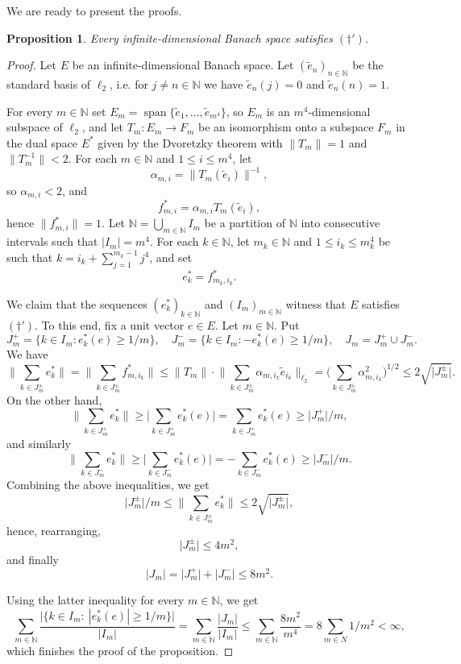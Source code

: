 \documentclass[a4paper,11pt,fleqn]{amsart}
\newtheorem{proposition}[theorem]{Proposition}
\theoremstyle{definition}
\theoremstyle{remark}
\numberwithin{equation}{section}
\newcommand{\N}{\mathbb{N}}
\DeclareMathOperator{\spn}{span}
\begin{document}
\medskip

We are ready to present the proofs.

\begin{proposition}\label{prop:daggerprim}
    Every infinite-dimensional Banach space satisfies $(\dagger')$.
\end{proposition}
\begin{proof}
    Let $E$ be an infinite-dimensional Banach space. Let $(\tilde{e}_n)_{n\in\N}$ be the standard basis of $\ell_2$, i.e. for $j\neq n\in\N$ we have $\tilde{e}_n(j)=0$ and $\tilde{e}_n(n)=1$.
    
    For every $m\in\N$ set $E_m=\spn\big\{\tilde{e}_1,\ldots,\tilde{e}_{m^4}\big\}$, so $E_m$ is an $m^4$-dimensional subspace of $\ell_2$, and let $T_m\colon E_m\to F_m$ be an isomorphism onto a subspace $F_m$ in the dual space $E^*$ given by the Dvoretzky theorem with $\|T_m\|=1$ and $\big\|T_m^{-1}\big\|<2$. For each $m\in\N$ and $1\le i\le m^4$, let 
    \[\alpha_{m,i}=\big\|T_m(\tilde{e}_i)\big\|^{-1},\]
    so $\alpha_{m,i}<2$, and
    \[f_{m,i}^*=\alpha_{m,i}T_m(\tilde{e}_i),\]
    hence $\big\|f_{m,i}^*\big\|=1$. Let $\N=\bigcup_{m\in\N}I_m$ be a partition of $\N$ into consecutive intervals such that $|I_m|=m^4$. For each $k\in\N$, let $m_k\in\N$ and $1\le i_k\le m_k^4$ be such that $k=i_k+\sum_{j=1}^{m_k-1}j^4$, and set 
    \[e_k^*=f_{m_k,i_k}^*.\]

    We claim that the sequences $(e_k^*)_{k\in\N}$ and $(I_m)_{m\in\N}$ witness that $E$ satisfies $(\dagger')$. To this end, fix a unit vector $e\in E$. Let $m\in\N$. Put
    \[J_m^+=\big\{k\in I_m\colon e_k^*(e)\ge1/m\big\},\quad J_m^-=\big\{k\in I_m\colon -e_k^*(e)\ge1/m\big\},\quad J_m=J_m^+\cup J_m^-.\]
    We have
    \[\bigg\|\sum_{k\in J_m^{\pm}}e_k^*\bigg\|=\bigg\|\sum_{k\in J_m^{\pm}}f_{m,i_k}^*\bigg\|\le\|T_m\|\cdot\bigg\|\sum_{k\in J_m^{\pm}}\alpha_{m,i_k}\tilde{e}_{i_k}\bigg\|_{\ell_2}=\bigg(\sum_{k\in J_m^{\pm}}\alpha_{m,i_k}^2\bigg)^{1/2}\le2\sqrt{\big|J_m^{\pm}\big|}.\]
    On the other hand,
    \[\bigg\|\sum_{k\in J_m^+}e_k^*\bigg\|\ge\bigg|\sum_{k\in J_m^+}e_k^*(e)\bigg|=\sum_{k\in J_m^+}e_k^*(e)\ge\big|J_m^+\big|/m,\]
    and similarly
    \[\bigg\|\sum_{k\in J_m^-}e_k^*\bigg\|\ge\bigg|\sum_{k\in J_m^-}e_k^*(e)\bigg|=-\sum_{k\in J_m^-}e_k^*(e)\ge\big|J_m^-\big|/m.\]
    Combining the above inequalities, we get
     \[\big|J_m^{\pm}\big|/m\le\bigg\|\sum_{k\in J_m^{\pm}}e_k^*\bigg\|\le2\sqrt{\big|J_m^{\pm}\big|},\]%
     hence, rearranging,
     \[\big|J_m^{\pm}\big|\le4m^2,\]%
     and finally
     \[|J_m|=\big|J_m^+\big|+\big|J_m^-\big|\le8m^2.\]

     Using the latter inequality for every $m\in\N$, we get
     \[\sum_{m\in\N}\frac{\big|\big\{k\in I_m\colon\ |e_k^*(e)|\ge1/m\big\}\big|}{|I_m|}=\sum_{m\in\N}\frac{|J_m|}{|I_m|}\le\sum_{m\in\N}\frac{8m^2}{m^4}=8\sum_{m\in N}1/m^2<\infty,\]
     which finishes the proof of the proposition.
\end{proof}
\end{document}
